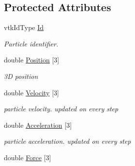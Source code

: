 \subsection*{Protected Attributes}
\begin{DoxyCompactItemize}
\item 
\hypertarget{classvtkParticle_ad1270a67572301092dae9cf356f75db8}{
vtkIdType \hyperlink{classvtkParticle_ad1270a67572301092dae9cf356f75db8}{Id}}
\label{classvtkParticle_ad1270a67572301092dae9cf356f75db8}

\begin{DoxyCompactList}\small\item\em Particle identifier. \item\end{DoxyCompactList}\item 
\hypertarget{classvtkParticle_a1960a7b95829f029a8a81ac5e9077a67}{
double \hyperlink{classvtkParticle_a1960a7b95829f029a8a81ac5e9077a67}{Position} \mbox{[}3\mbox{]}}
\label{classvtkParticle_a1960a7b95829f029a8a81ac5e9077a67}

\begin{DoxyCompactList}\small\item\em 3D position \item\end{DoxyCompactList}\item 
\hypertarget{classvtkParticle_accfbbf5bae86baa4021eb3c2e6ae1ff3}{
double \hyperlink{classvtkParticle_accfbbf5bae86baa4021eb3c2e6ae1ff3}{Velocity} \mbox{[}3\mbox{]}}
\label{classvtkParticle_accfbbf5bae86baa4021eb3c2e6ae1ff3}

\begin{DoxyCompactList}\small\item\em particle velocity. updated on every step \item\end{DoxyCompactList}\item 
\hypertarget{classvtkParticle_a2c031655cfb160edbe68f3bd6b239711}{
double \hyperlink{classvtkParticle_a2c031655cfb160edbe68f3bd6b239711}{Acceleration} \mbox{[}3\mbox{]}}
\label{classvtkParticle_a2c031655cfb160edbe68f3bd6b239711}

\begin{DoxyCompactList}\small\item\em particle acceleration. updated on every step \item\end{DoxyCompactList}\item 
\hypertarget{classvtkParticle_a397523ba78fec6de30dab9094ffa7002}{
double \hyperlink{classvtkParticle_a397523ba78fec6de30dab9094ffa7002}{Force} \mbox{[}3\mbox{]}}
\label{classvtkParticle_a397523ba78fec6de30dab9094ffa7002}


\end{DoxyCompactItemize}
